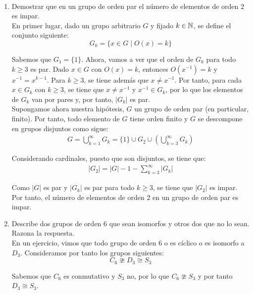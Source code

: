 \documentclass[12pt]{article}
\begin{document}
\begin{ejercicio}
\begin{enumerate}
        \end{enumerate}
    \end{ejercicio}


    \newpage
    \setcounter{ejercicio}{0}
    \begin{ejercicio}~
        \begin{enumerate}
            \item Demostrar que en un grupo de orden par el número de elementos de orden 2 es impar.\\
            
            En primer lugar, dado un grupo arbitrario $G$ y fijado $k \in \mathbb{N}$, se define el conjunto siguiente:
            \begin{equation*}
                G_k = \{x \in G \mid O(x) = k\}
            \end{equation*}

            Sabemos que $G_1=\{1\}$. Ahora, vamos a ver que el orden de $G_k$ para todo $k\geq 3$ es par. Dado $x\in G$ con $O(x)=k$, entonces $O(x^{-1})=k$ y $x^{-1}=x^{k-1}$. Para $k\geq 3$, se tiene además que $x\neq x^{-1}$. Por tanto, para cada $x\in G_k$ con $k\geq 3$, se tiene que $x\neq x^{-1}$ y $x^{-1}\in G_k$, por lo que los elementos de $G_k$ van por pares y, por tanto, $|G_k|$ es par.\\

            Supongamos ahora nuestra hipótesis, $G$ un grupo de orden par (en particular, finito). Por tanto, todo elemento de $G$ tiene orden finito y $G$ se descompone en grupos disjuntos como sigue:
            \begin{align*}
                G=\bigcup_{k=1}^{\infty}G_k = \{1\}\cup G_2\cup \left(\bigcup_{k=3}^{\infty}G_k\right)
            \end{align*}

            Considerando cardinales, puesto que son disjuntos, se tiene que:
            \begin{align*}
                |G_2| = |G|-1-\sum_{k=3}^{\infty}|G_k|
            \end{align*}

            Como $|G|$ es par y $|G_k|$ es par para todo $k\geq 3$, se tiene que $|G_2|$ es impar. Por tanto, el número de elementos de orden 2 en un grupo de orden par es impar.
            \item Describe dos grupos de orden 6 que sean isomorfos y otros dos que no lo sean. Razona la respuesta.\\
            
            En un ejercicio, vimos que todo grupo de orden $6$ o es cíclico o es isomorfo a $D_3$. Consideramos por tanto los grupos siguientes:
            \begin{equation*}
                C_6\ncong D_3\cong S_3
            \end{equation*}

            Sabemos que $C_6$ es conmutativo y $S_3$ no, por lo que $C_6\ncong S_3$ y por tanto $D_3\cong S_3$.
        \end{enumerate}
    \end{ejercicio}
\end{document}
